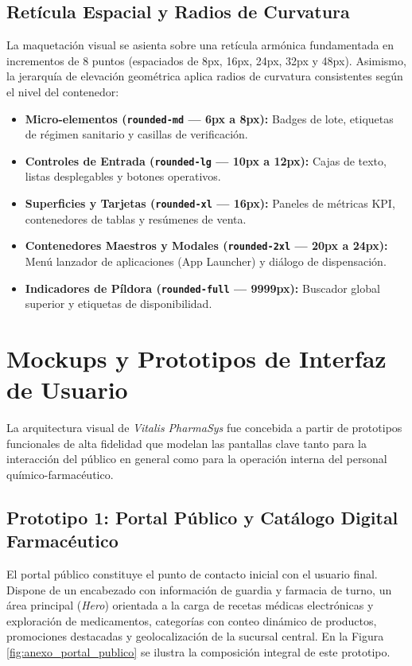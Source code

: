 \subsection{Retícula Espacial y Radios de Curvatura}
La maquetación visual se asienta sobre una retícula armónica fundamentada en incrementos de 8 puntos (espaciados de 8px, 16px, 24px, 32px y 48px). Asimismo, la jerarquía de elevación geométrica aplica radios de curvatura consistentes según el nivel del contenedor:
\begin{itemize}
    \item \textbf{Micro-elementos (\texttt{rounded-md} --- 6px a 8px):} Badges de lote, etiquetas de régimen sanitario y casillas de verificación.
    \item \textbf{Controles de Entrada (\texttt{rounded-lg} --- 10px a 12px):} Cajas de texto, listas desplegables y botones operativos.
    \item \textbf{Superficies y Tarjetas (\texttt{rounded-xl} --- 16px):} Paneles de métricas KPI, contenedores de tablas y resúmenes de venta.
    \item \textbf{Contenedores Maestros y Modales (\texttt{rounded-2xl} --- 20px a 24px):} Menú lanzador de aplicaciones (App Launcher) y diálogo de dispensación.
    \item \textbf{Indicadores de Píldora (\texttt{rounded-full} --- 9999px):} Buscador global superior y etiquetas de disponibilidad.
\end{itemize}

\section{Mockups y Prototipos de Interfaz de Usuario}

La arquitectura visual de \textit{Vitalis PharmaSys} fue concebida a partir de prototipos funcionales de alta fidelidad que modelan las pantallas clave tanto para la interacción del público en general como para la operación interna del personal químico-farmacéutico.

\subsection{Prototipo 1: Portal Público y Catálogo Digital Farmacéutico}
El portal público constituye el punto de contacto inicial con el usuario final. Dispone de un encabezado con información de guardia y farmacia de turno, un área principal (\textit{Hero}) orientada a la carga de recetas médicas electrónicas y exploración de medicamentos, categorías con conteo dinámico de productos, promociones destacadas y geolocalización de la sucursal central. En la Figura \ref{fig:anexo_portal_publico} se ilustra la composición integral de este prototipo.

